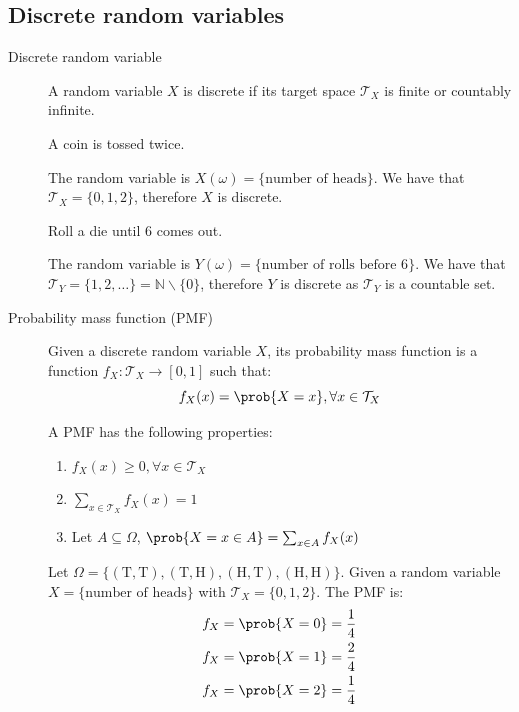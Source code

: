 \subsection{Discrete random variables}

\begin{description}
    \item[Discrete random variable] 
        A random variable $X$ is discrete if its target space $\mathcal{T}_X$ is finite or countably infinite.

        \begin{example}
            A coin is tossed twice.

            The random variable is $X(\omega) = \{ \text{number of heads} \}$.
            We have that $\mathcal{T}_X = \{ 0, 1, 2 \}$, therefore $X$ is discrete.
        \end{example}

        \begin{example}
            Roll a die until 6 comes out.

            The random variable is $Y(\omega) = \{ \text{number of rolls before 6} \}$.
            We have that $\mathcal{T}_Y = \{ 1, 2, \dots \} = \mathbb{N} \smallsetminus \{0\}$, 
            therefore $Y$ is discrete as $\mathcal{T}_Y$ is a countable set.
        \end{example}

    \item[Probability mass function (PMF)] 
        Given a discrete random variable $X$, its probability mass function is a function $f_X: \mathcal{T}_X \rightarrow [0, 1]$ such that:
        \[ f_X(x) = \prob{X = x}, \forall x \in \mathcal{T}_X \]

        A PMF has the following properties:
        \begin{enumerate}
            \item $f_X(x) \geq 0, \forall x \in \mathcal{T}_X$
            \item $\sum_{x \in \mathcal{T}_X} f_X(x) = 1$
            \item Let $A \subseteq \Omega$, $\prob{X = x \in A} = \sum_{x \in A} f_X(x)$
        \end{enumerate}

        \begin{example}
            Let $\Omega = \{ (\text{T}, \text{T}), (\text{T}, \text{H}), (\text{H}, \text{T}), (\text{H}, \text{H}) \}$.
            Given a random variable $X = \{ \text{number of heads} \}$ with $\mathcal{T}_X = \{ 0, 1, 2 \}$.
            The PMF is:
            \[
                \begin{split}
                    f_X &= \prob{X = 0} = \frac{1}{4} \\
                    f_X &= \prob{X = 1} = \frac{2}{4} \\
                    f_X &= \prob{X = 2} = \frac{1}{4}
                \end{split}  
            \]
        \end{example}
\end{description}

